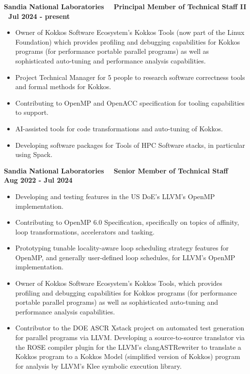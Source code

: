 
\textbf{{Sandia National Laboratories $\>$$\>$$\>$  Principal Member of Technical Staff II $\>$$\>$$\>$Jul 2024 - present}} 
\begin{itemize}
	\item Owner of Kokkos Software Ecosystem's Kokkos Tools (now part of the Linux Foundation) which provides profiling and debugging capabilities for Kokkos programs (for performance portable parallel programs) as well as sophisticated auto-tuning and performance analysis capabilities.
	\item Project Technical Manager for 5 people to research software correctness tools and formal methods for Kokkos.  
	\item Contributing to OpenMP and OpenACC specification for tooling capabilities to support. 
    \item AI-assisted tools for code transformations and auto-tuning of Kokkos. 

	\item Developing software packages for Tools of HPC Software stacks, in particular using Spack.
\end{itemize} 

\textbf{{Sandia National Laboratories $\>$$\>$$\>$ Senior Member of Technical Staff $\>$$\>$$\>$Aug 2022 - Jul 2024}} 


\begin{itemize}
\item Developing and testing features in the US DoE's LLVM's OpenMP implementation. 
\item Contributing to OpenMP 6.0 Specification, specifically on topics of affinity, loop transformations, accelerators and tasking.
\item Prototyping tunable locality-aware loop scheduling strategy features for OpenMP, and generally user-defined loop schedules, for LLVM's OpenMP implementation.  
\item Owner of Kokkos Software Ecosystem's Kokkos Tools, which provides profiling and debugging capabilities for Kokkos programs (for performance portable parallel programs) as well as sophisticated auto-tuning and performance analysis capabilities.
\item Contributor to the DOE ASCR Xstack project on automated test generation for parallel programs via LLVM. Developing a source-to-source translator via the ROSE compiler plugin for the LLVM's clangASTRewriter to translate a Kokkos program to a Kokkos Model (simplified version of Kokkos) program for analysis by LLVM's Klee symbolic execution library.
\end{itemize}

